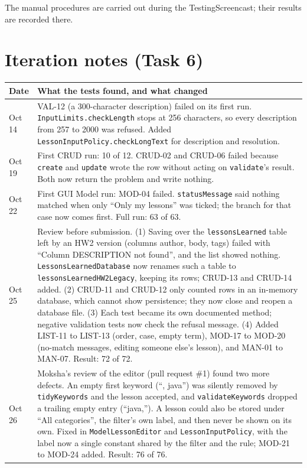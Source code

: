 \documentclass[10pt]{article}
\begin{document}
The manual procedures are carried out during the TestingScreencast; their results are recorded
there.

\section*{Iteration notes (Task 6)}
\begin{tabularx}{\linewidth}{@{}l X@{}}
\toprule
\textbf{Date} & \textbf{What the tests found, and what changed} \\
\midrule
Oct 14 & VAL-12 (a 300-character description) failed on its first run. \texttt{InputLimits.checkLength}
  stops at 256 characters, so every description from 257 to 2000 was refused. Added
  \texttt{LessonInputPolicy.checkLongText} for description and resolution. \\
Oct 19 & First CRUD run: 10 of 12. CRUD-02 and CRUD-06 failed because \texttt{create} and \texttt{update}
  wrote the row without acting on \texttt{validate}'s result. Both now return the problem and write
  nothing. \\
Oct 22 & First GUI Model run: MOD-04 failed. \texttt{statusMessage} said nothing matched when only
  ``Only my lessons'' was ticked; the branch for that case now comes first. Full run: 63 of 63. \\
Oct 25 & Review before submission. (1) Saving over the \texttt{lessonsLearned} table left by an HW2
  version (columns author, body, tags) failed with ``Column DESCRIPTION not found'', and the list
  showed nothing. \texttt{LessonsLearnedDatabase} now renames such a table to
  \texttt{lessonsLearnedHW2Legacy}, keeping its rows; CRUD-13 and CRUD-14 added. (2) CRUD-11 and
  CRUD-12 only counted rows in an in-memory database, which cannot show persistence; they now close
  and reopen a database file. (3) Each test became its own documented method; negative validation
  tests now check the refusal message. (4) Added LIST-11 to LIST-13 (order, case, empty term),
  MOD-17 to MOD-20 (no-match messages, editing someone else's lesson), and MAN-01 to MAN-07.
  Result: 72 of 72. \\
Oct 26 & Moksha's review of the editor (pull request \#1) found two more defects. An empty first
  keyword (``, java'') was silently removed by \texttt{tidyKeywords} and the lesson accepted, and
  \texttt{validateKeywords} dropped a trailing empty entry (``java,''). A lesson could also be
  stored under ``All categories'', the filter's own label, and then never be shown on its own.
  Fixed in \texttt{ModelLessonEditor} and \texttt{LessonInputPolicy}, with the label now a single
  constant shared by the filter and the rule; MOD-21 to MOD-24 added. Result: 76 of 76. \\
\bottomrule
\end{tabularx}
\end{document}
